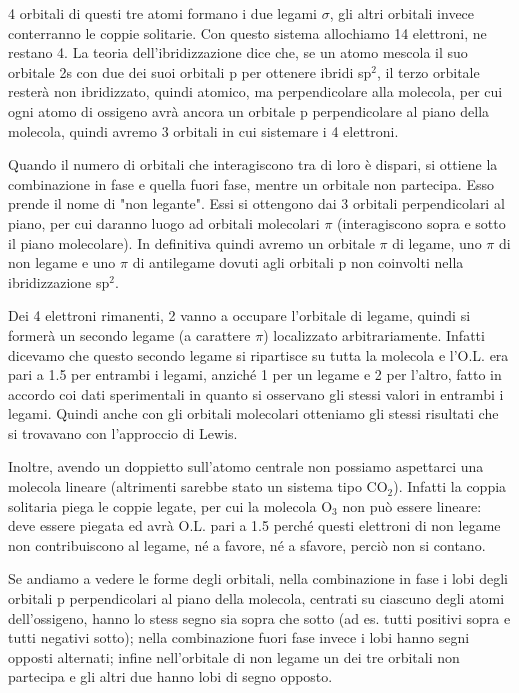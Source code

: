 4 orbitali di questi tre atomi formano i due legami $\sigma$, gli altri orbitali invece conterranno le coppie solitarie. Con questo sistema allochiamo 14 elettroni, ne restano 4. La teoria dell'ibridizzazione dice che, se un atomo mescola il suo orbitale 2s con due dei suoi orbitali p per ottenere ibridi sp$^2$, il terzo orbitale resterà non ibridizzato, quindi atomico, ma perpendicolare alla molecola, per cui ogni atomo di ossigeno avrà ancora un orbitale p perpendicolare al piano della molecola, quindi avremo 3 orbitali in cui sistemare i 4 elettroni.

Quando il numero di orbitali che interagiscono tra di loro è dispari, si ottiene la combinazione in fase e quella fuori fase, mentre un orbitale non partecipa. Esso prende il nome di "non legante". Essi si ottengono dai 3 orbitali perpendicolari al piano, per cui daranno luogo ad orbitali molecolari $\pi$ (interagiscono sopra e sotto il piano molecolare). In definitiva quindi avremo un orbitale $\pi$ di legame, uno $\pi$ di non legame e uno $\pi$ di antilegame dovuti agli orbitali p non coinvolti nella ibridizzazione sp$^2$.

Dei 4 elettroni rimanenti, 2 vanno a occupare l'orbitale di legame, quindi si formerà un secondo legame (a carattere $\pi$) localizzato arbitrariamente. Infatti dicevamo che questo secondo legame si ripartisce su tutta la molecola e l'O.L. era pari a 1.5 per entrambi i legami, anziché 1 per un legame e 2 per l'altro, fatto in accordo coi dati sperimentali in quanto si osservano gli stessi valori in entrambi i legami. Quindi anche con gli orbitali molecolari otteniamo gli stessi risultati che si trovavano con l'approccio di Lewis.

Inoltre, avendo un doppietto sull'atomo centrale non possiamo aspettarci una molecola lineare (altrimenti sarebbe stato un sistema tipo CO$_2$). Infatti la coppia solitaria piega le coppie legate, per cui la molecola O$_3$ non può essere lineare: deve essere piegata ed avrà O.L. pari a 1.5 perché questi elettroni di non legame non contribuiscono al legame, né a favore, né a sfavore, perciò non si contano.

Se andiamo a vedere le forme degli orbitali, nella combinazione in fase i lobi degli orbitali p perpendicolari al piano della molecola, centrati su ciascuno degli atomi dell'ossigeno, hanno lo stess segno sia sopra che sotto (ad es. tutti positivi sopra e tutti negativi sotto); nella combinazione fuori fase invece i lobi hanno segni opposti alternati; infine nell'orbitale di non legame un dei tre orbitali non partecipa e gli altri due hanno lobi di segno opposto.

